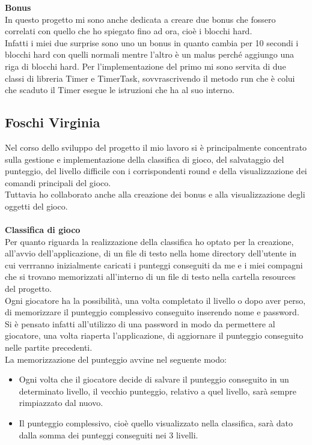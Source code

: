\documentclass[a4paper,12pt]{report}
\begin{document}
\textbf{Bonus}\\
In questo progetto mi sono anche dedicata a creare due bonus che fossero correlati con quello che ho spiegato fino ad ora, cioè i blocchi hard.
\\Infatti i miei due surprise sono uno un bonus in quanto cambia per 10 secondi i blocchi hard con quelli normali mentre l'altro è un malus perché aggiungo una riga di
blocchi hard. Per l'implementazione del primo mi sono servita di due classi di libreria Timer e TimerTask, sovvrascrivendo il metodo run che è colui che scaduto il Timer
esegue le istruzioni che ha al suo interno.

\pagebreak
\subsection{Foschi Virginia}
Nel corso dello sviluppo del progetto il mio lavoro si è principalmente concentrato sulla gestione e implementazione della classifica di gioco, del salvataggio del punteggio, del livello difficile con i corrispondenti round e della visualizzazione dei comandi principali del gioco.\\
Tuttavia ho collaborato anche alla creazione dei bonus e alla visualizzazione degli oggetti del gioco.\\\\
\textbf{Classifica di gioco}\\
Per quanto riguarda la realizzazione della classifica ho optato per la creazione, all'avvio dell'applicazione, di un file di testo nella home directory dell'utente in cui verrranno inizialmente caricati i punteggi conseguiti da me e i miei compagni che si trovano memorizzati all'interno di un file di testo nella cartella resources del progetto.
\\Ogni giocatore ha la possibilità, una volta completato il livello o dopo aver perso, di memorizzare il punteggio complessivo conseguito inserendo nome e password. Si è pensato infatti all'utilizzo di una password in modo da permettere al giocatore, una volta riaperta l'applicazione, di aggiornare il punteggio conseguito nelle partite precedenti.
\\La memorizzazione del punteggio avvine nel seguente modo:
\begin{itemize}
    \item Ogni volta che il giocatore decide di salvare il punteggio conseguito in un determinato livello, il vecchio punteggio, relativo a quel livello, sarà sempre rimpiazzato dal nuovo.
    \item Il punteggio complessivo, cioè quello visualizzato nella classifica, sarà dato dalla somma dei punteggi conseguiti nei 3 livelli.
\end{itemize}
\end{document}
